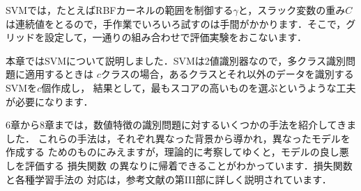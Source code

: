SVMでは，たとえばRBFカーネルの範囲を制御する$\gamma$と，スラック変数の重み$C$は連続値をとるので，手作業でいろいろ試すのは手間がかかります．そこで，グリッドを設定して，一通りの組み合わせで評価実験をおこないます．


本章ではSVMについて説明しました．SVMは2値識別器なので，多クラス識別問題に適用するときは
$c$クラスの場合，あるクラスとそれ以外のデータを識別するSVMを$c$個作成し，
結果として，最もスコアの高いものを選ぶというような工夫が必要になります．

6章から8章までは，数値特徴の識別問題に対するいくつかの手法を紹介してきました．
これらの手法は，それぞれ異なった背景から導かれ，異なったモデルを作成する
ためのものにみえますが，理論的に考察してゆくと，モデルの良し悪しを評価する
損失関数
の異なりに帰着できることがわかっています．損失関数と各種学習手法の
対応は，参考文献\cite{sugiyama13}の第III部に詳しく説明されています．
